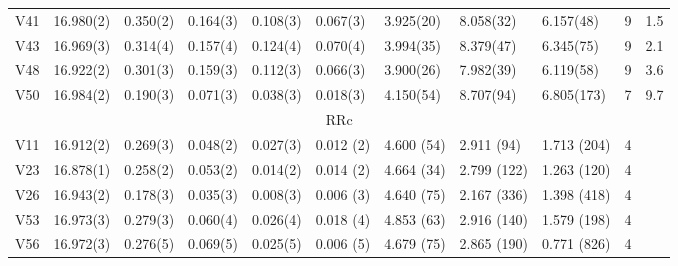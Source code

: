 \documentclass[journal]{rmaa}
\newcommand{\1}{\'{\i}}
\begin{document}
\begin{table*}
\begin{center}
\begin{tabular}{lllllllllrr}
V41 &16.980(2)& 0.350(2)& 0.164(3)& 0.108(3)& 0.067(3)& 3.925(20)& 8.058(32)& 6.157(48)& 9&1.5\\
V43 &16.969(3)& 0.314(4)& 0.157(4)& 0.124(4)& 0.070(4)& 3.994(35)& 8.379(47)& 6.345(75)& 9&2.1\\
V48 &16.922(2)& 0.301(3)& 0.159(3)& 0.112(3)& 0.066(3)& 3.900(26)& 7.982(39)& 6.119(58)& 9&3.6\\
V50 &16.984(2)& 0.190(3)& 0.071(3)& 0.038(3)& 0.018(3)& 4.150(54)& 8.707(94)& 6.805(173)& 7&9.7\\
\hline
\multicolumn{11}{c}{RRc} \\
\hline
V11& 16.912(2) &0.269(3)& 0.048(2)&0.027(3)& 0.012 (2)& 4.600 (54)& 2.911  (94)& 1.713 (204)&4& \\
V23& 16.878(1) &0.258(2)& 0.053(2)&0.014(2)& 0.014 (2)& 4.664 (34)& 2.799 (122)& 1.263 (120)&4& \\
V26& 16.943(2) &0.178(3)& 0.035(3)&0.008(3)& 0.006 (3)& 4.640 (75)& 2.167 (336)& 1.398 (418)&4& \\
V53& 16.973(3) &0.279(3)& 0.060(4)&0.026(4)& 0.018 (4)& 4.853 (63)& 2.916 (140)& 1.579 (198)&4& \\
V56& 16.972(3) &0.276(5)& 0.069(5)&0.025(5)& 0.006 (5)& 4.679 (75)& 2.865 (190)& 0.771 (826)&4& \\
\hline
\end{tabular}
\end{center}
\end{table*}
\end{document}
